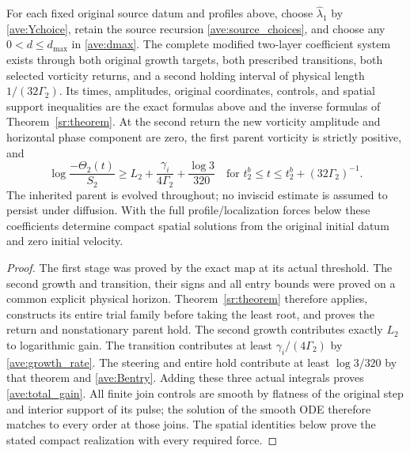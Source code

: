 \begin{theorem}\label{ave:complete_entry}
For each fixed original source datum and profiles above, choose
$\widehat\lambda_1$ by \eqref{ave:Ychoice}, retain the source recursion
\eqref{ave:source_choices}, and choose any $0<d\leq d_{\max}$ in
\eqref{ave:dmax}. The complete modified two-layer coefficient system
exists through both original growth targets, both prescribed
transitions, both selected vorticity returns, and a second holding
interval of physical length $1/(32\Gamma_2)$.
Its times, amplitudes, original coordinates, controls, and spatial
support inequalities are the exact formulas above and the inverse
formulas of Theorem~\ref{sr:theorem}. At the second return the new
vorticity amplitude and horizontal phase component are zero, the
first parent vorticity is strictly positive, and
\begin{equation}\label{ave:total_gain}
 \log\frac{-\Theta_2(t)}{S_2}
 \geq L_2+\frac{\gamma_i}{4\Gamma_2}+\frac{\log3}{320}
 \quad\text{for }t_2^b\leq t\leq t_2^b+(32\Gamma_2)^{-1}.
\end{equation}
The inherited parent is evolved throughout; no inviscid estimate is
assumed to persist under diffusion. With the full profile/localization
forces below these coefficients determine compact spatial solutions
from the original initial datum and zero initial velocity.
\end{theorem}
\begin{proof}
The first stage was proved by the exact map at its actual threshold.
The second growth and transition, their signs and all entry bounds
were proved on a common explicit physical horizon. Theorem~\ref{sr:theorem}
therefore applies, constructs its entire trial family before taking
the least root, and proves the return and nonstationary parent hold.
The second growth contributes exactly $L_2$ to logarithmic gain.
The transition contributes at least $\gamma_i/(4\Gamma_2)$ by
\eqref{ave:growth_rate}. The steering and entire hold contribute at
least $\log3/320$ by that theorem and \eqref{ave:Bentry}.
Adding these three actual integrals proves \eqref{ave:total_gain}.
All finite join controls are smooth by flatness of the original step
and interior support of its pulse; the solution of the smooth ODE
therefore matches to every order at those joins. The spatial identities
below prove the stated compact realization with every required force.
\end{proof}

